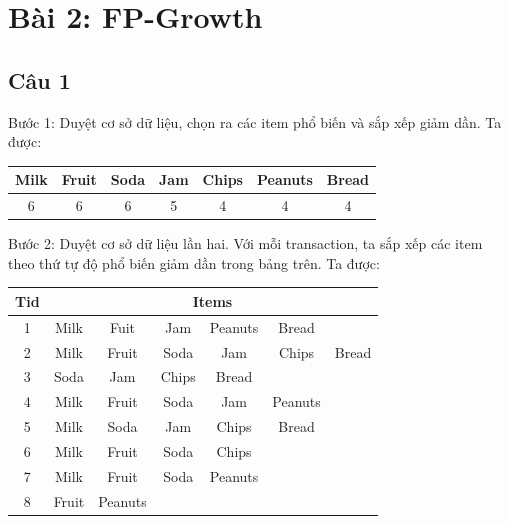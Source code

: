 \documentclass{article}
\begin{document}
\section{Bài 2: FP-Growth}\label{sec: prob2}
\subsection{Câu 1}
\begin{flushleft}
Bước 1: Duyệt cơ sở dữ liệu, chọn ra các item phổ biến và sắp xếp giảm dần. Ta được:\\
\begin{center}
\begin{tabular}{|c|c|c|c|c|c|c|}
	\hline Milk & Fruit & Soda & Jam & Chips & Peanuts & Bread \\ 
	\hline 6 & 6 & 6 & 5 & 4 & 4 & 4 \\ 
	\hline 
\end{tabular} 
\end{center}
Bước 2: Duyệt cơ sở dữ liệu lần hai. Với mỗi transaction, ta sắp xếp các item theo thứ tự độ phổ biến giảm dần trong bảng trên. Ta được:\\
\begin{center}
\begin{tabular}{c|c c c c c c }
	Tid & \multicolumn{6}{c}{Items}  \\ 
	\hline 1 & Milk & Fuit & Jam & Peanuts & Bread &  \\ 
	2 & Milk & Fruit & Soda & Jam & Chips & Bread \\ 
	3 & Soda & Jam & Chips & Bread &  &  \\ 
	4 & Milk & Fruit & Soda & Jam & Peanuts &  \\ 
	5 & Milk & Soda & Jam & Chips & Bread &  \\ 
	6 & Milk & Fruit & Soda & Chips &  &  \\ 
	7 & Milk & Fruit & Soda & Peanuts &  &  \\ 
	8 & Fruit & Peanuts &  &  &  &  \\ 
\end{tabular} 
\end{center}




\end{flushleft}
\end{document}

